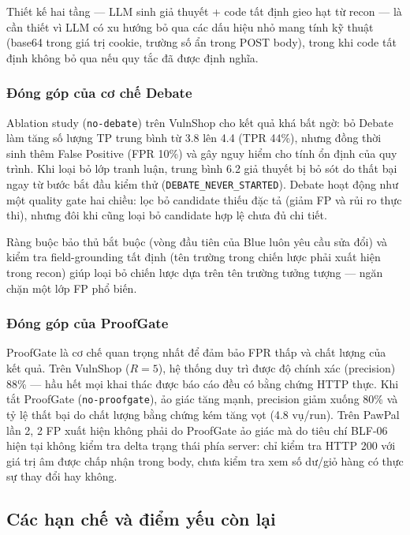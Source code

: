 Thiết kế hai tầng --- LLM sinh giả thuyết + code tất định gieo hạt từ recon --- là cần thiết vì LLM có xu hướng bỏ qua các dấu hiệu nhỏ mang tính kỹ thuật (base64 trong giá trị cookie, trường số ẩn trong POST body), trong khi code tất định không bỏ qua nếu quy tắc đã được định nghĩa.

\subsubsection{Đóng góp của cơ chế Debate}

Ablation study (\texttt{no-debate}) trên VulnShop cho kết quả khá bất ngờ: bỏ Debate làm tăng số lượng TP trung bình từ 3.8 lên 4.4 (TPR 44\%), nhưng đồng thời sinh thêm False Positive (FPR 10\%) và gây nguy hiểm cho tính ổn định của quy trình. Khi loại bỏ lớp tranh luận, trung bình 6.2 giả thuyết bị bỏ sót do thất bại ngay từ bước bắt đầu kiểm thử (\texttt{DEBATE\_NEVER\_STARTED}). Debate hoạt động như một quality gate hai chiều: lọc bỏ candidate thiếu đặc tả (giảm FP và rủi ro thực thi), nhưng đôi khi cũng loại bỏ candidate hợp lệ chưa đủ chi tiết.

Ràng buộc bảo thủ bắt buộc (vòng đầu tiên của Blue luôn yêu cầu sửa đổi) và kiểm tra field-grounding tất định (tên trường trong chiến lược phải xuất hiện trong recon) giúp loại bỏ chiến lược dựa trên tên trường tưởng tượng --- ngăn chặn một lớp FP phổ biến.

\subsubsection{Đóng góp của ProofGate}

ProofGate là cơ chế quan trọng nhất để đảm bảo FPR thấp và chất lượng của kết quả. Trên VulnShop ($R=5$), hệ thống duy trì được độ chính xác (precision) 88\% --- hầu hết mọi khai thác được báo cáo đều có bằng chứng HTTP thực. Khi tắt ProofGate (\texttt{no-proofgate}), ảo giác tăng mạnh, precision giảm xuống 80\% và tỷ lệ thất bại do chất lượng bằng chứng kém tăng vọt (4.8 vụ/run). Trên PawPal lần 2, 2 FP xuất hiện không phải do ProofGate ảo giác mà do tiêu chí BLF-06 hiện tại không kiểm tra delta trạng thái phía server: chỉ kiểm tra HTTP 200 với giá trị âm được chấp nhận trong body, chưa kiểm tra xem số dư/giỏ hàng có thực sự thay đổi hay không.

\subsection{Các hạn chế và điểm yếu còn lại}

